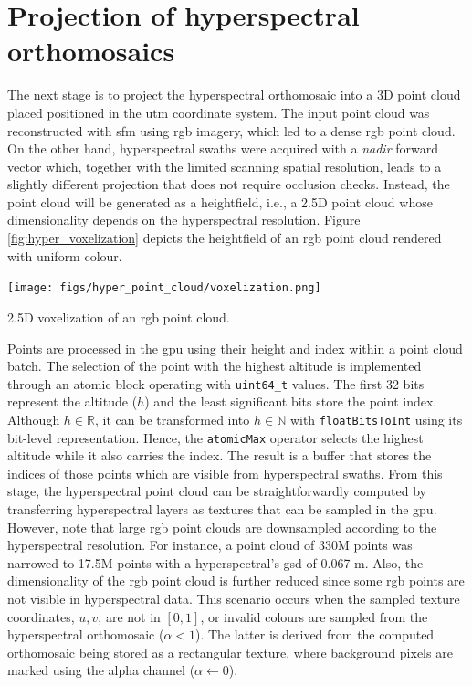 \section{Projection of hyperspectral orthomosaics}

The next stage is to project the hyperspectral orthomosaic into a 3D point cloud placed positioned in the \acrshort{utm} coordinate system. The input point cloud was reconstructed with \acrshort{sfm} using \acrshort{rgb} imagery, which led to a dense \acrshort{rgb} point cloud. On the other hand, hyperspectral swaths were acquired with a \textit{nadir} forward vector which, together with the limited scanning spatial resolution, leads to a slightly different projection that does not require occlusion checks. Instead, the point cloud will be generated as a heightfield, i.e., a 2.5D point cloud whose dimensionality depends on the hyperspectral resolution. Figure \ref{fig:hyper_voxelization} depicts the heightfield of an \acrshort{rgb} point cloud rendered with uniform colour.

\begin{marginfigure}[.1cm]
    \centering
    \texttt{[image: figs/hyper\_point\_cloud/voxelization.png]}
	\caption{2.5D voxelization of an \acrshort{rgb} point cloud. }
	\label{fig:hyper_voxelization}
\end{marginfigure}
Points are processed in the \acrshort{gpu} using their height and index within a point cloud batch. The selection of the point with the highest altitude is implemented through an atomic block operating with \verb|uint64_t| values. The first 32 bits represent the altitude ($h$) and the least significant bits store the point index. Although $h \in \mathbb{R}$, it can be transformed into $h \in \mathbb{N}$ with \verb|floatBitsToInt| using its bit-level representation. Hence, the \verb|atomicMax| operator selects the highest altitude while it also carries the index. The result is a buffer that stores the indices of those points which are visible from hyperspectral swaths. From this stage, the hyperspectral point cloud can be straightforwardly computed by transferring hyperspectral layers as textures that can be sampled in the \acrshort{gpu}. However, note that large \acrshort{rgb} point clouds are downsampled according to the hyperspectral resolution. For instance, a point cloud of 330M points was narrowed to 17.5M points with a hyperspectral's \acrshort{gsd} of 0.067 \si{\meter}. Also, the dimensionality of the \acrshort{rgb} point cloud is further reduced since some \acrshort{rgb} points are not visible in hyperspectral data. This scenario occurs when the sampled texture coordinates, $u, v$, are not in $\left[0, 1\right]$, or invalid colours are sampled from the hyperspectral orthomosaic ($\alpha < 1$). The latter is derived from the computed orthomosaic being stored as a rectangular texture, where background pixels are marked using the alpha channel ($\alpha \gets 0$). 


